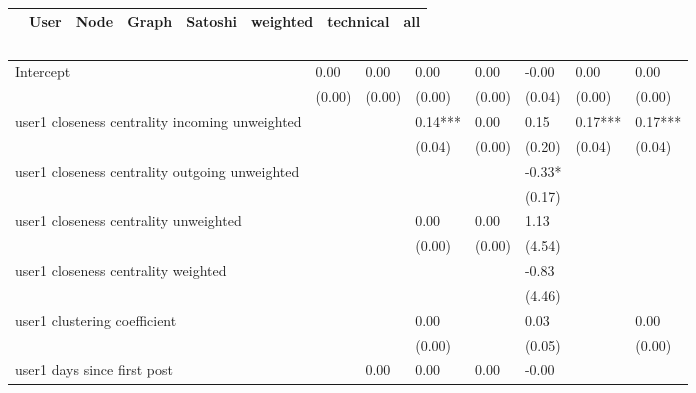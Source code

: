 \begin{table}
\caption{}
\begin{center}
\begin{tabular}{lccccccc}
\hline
                                               &   User  &   Node  &  Graph  & Satoshi &   weighted  & technical &   all    \\
\hline
\hline
\end{tabular}
\begin{tabular}{llllllll}
Intercept                                      & 0.00    & 0.00    & 0.00    & 0.00    & -0.00       & 0.00      & 0.00     \\
                                               & (0.00)  & (0.00)  & (0.00)  & (0.00)  & (0.04)      & (0.00)    & (0.00)   \\
user1 closeness centrality incoming unweighted &         &         & 0.14*** & 0.00    & 0.15        & 0.17***   & 0.17***  \\
                                               &         &         & (0.04)  & (0.00)  & (0.20)      & (0.04)    & (0.04)   \\
user1 closeness centrality outgoing unweighted &         &         &         &         & -0.33*      &           &          \\
                                               &         &         &         &         & (0.17)      &           &          \\
user1 closeness centrality unweighted          &         &         & 0.00    & 0.00    & 1.13        &           &          \\
                                               &         &         & (0.00)  & (0.00)  & (4.54)      &           &          \\
user1 closeness centrality weighted            &         &         &         &         & -0.83       &           &          \\
                                               &         &         &         &         & (4.46)      &           &          \\
user1 clustering coefficient                   &         &         & 0.00    &         & 0.03        &           & 0.00     \\
                                               &         &         & (0.00)  &         & (0.05)      &           & (0.00)   \\
user1 days since first post                    &         & 0.00    & 0.00    & 0.00    & -0.00       &           &          \\

\end{tabular}
\end{center}
\end{table}
